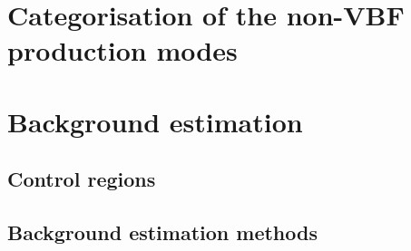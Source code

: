 \section{Categorisation of the non-VBF production modes}
\label{sec:htoinv_categorisation}


\section{Background estimation}
\label{sec:htoinv_background_est}

\subsection{Control regions}
\label{subsec:htoinv_crs}

\subsection{Background estimation methods}
\label{subsec:htoinv_background_methods}
